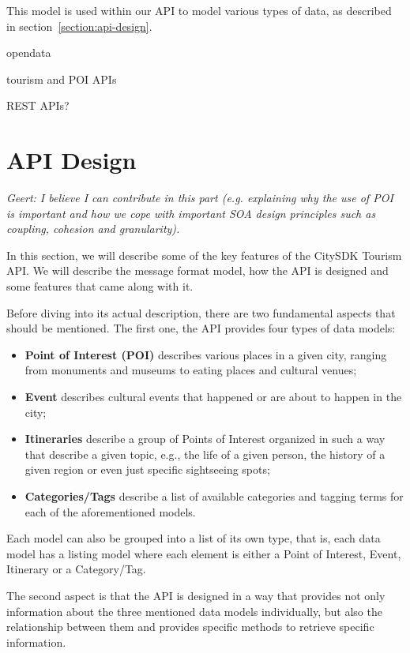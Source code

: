 \documentclass[times]{ettauth}
\begin{document}
This model is used within our API to model various types of data, as described in section~\ref{section:api-design}.

opendata

tourism and POI APIs

REST APIs?


\section{API Design}

\emph{Geert: I believe I can contribute in this part (e.g. explaining why the use of POI is important and how we cope with important SOA design principles such as coupling, cohesion and granularity).}

In this section, we will describe some of the key features of the CitySDK Tourism API. We will describe the message format model, how the API is designed and some features that came along with it.

Before diving into its actual description, there are two fundamental aspects that should be mentioned. The first one, the API provides four types of data models:
\begin{itemize}
\item \textbf{Point of Interest (POI)} describes various places in a given city, ranging from monuments and museums to eating places and cultural venues; 
\item \textbf{Event} describes cultural events that happened or are about to happen in the city;
\item \textbf{Itineraries} describe a group of Points of Interest organized in such a way that describe a given topic, e.g., the life of a given person, the history of a given region or even just specific sightseeing spots;
\item \textbf{Categories/Tags} describe a list of available categories and tagging terms for each of the aforementioned models.
\end{itemize}

Each model can also be grouped into a list of its own type, that is, each data model has a listing model where each element is either a Point of Interest, Event, Itinerary or a Category/Tag.

The second aspect is that the API is designed in a way that provides not only information about the three mentioned data models individually, but also the relationship between them and provides specific methods to retrieve specific information.
\end{document}

